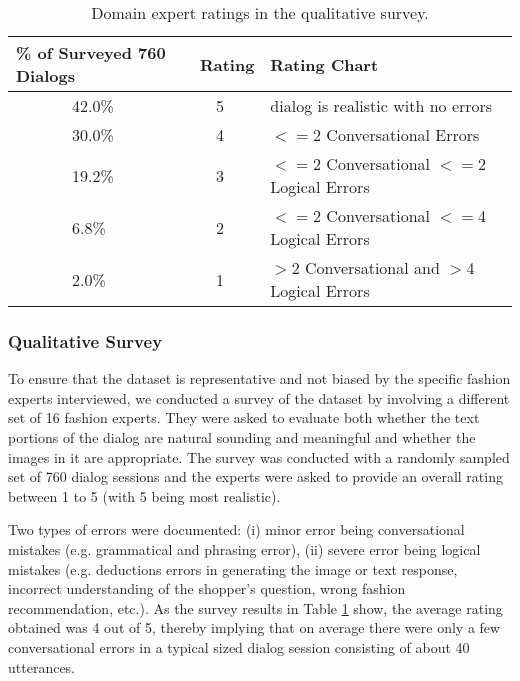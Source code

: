 \documentclass[letterpaper]{article} %
\begin{document}
\begin{table}[!htbp]
{\tiny
\captionsetup{font=small}
\begin{center}
\begin{tabular}{|p{1.84cm}|p{0.7cm}|p{4cm}|}\hline
\textbf{\% of Surveyed 760 Dialogs} & \textbf{Rating} & \textbf{Rating Chart} \\ \hline
~~~~~~~42.0\% & ~~5 & dialog is realistic with no errors \\ \hline
~~~~~~~30.0\% & ~~4 & $<=$2 Conversational Errors\\ \hline
~~~~~~~19.2\% & ~~3 & $<=$2 Conversational $<=$2 Logical Errors  \\ \hline
~~~~~~~6.8\% & ~~2 & $<=$2 Conversational $<=$4 Logical Errors \\ \hline
~~~~~~~2.0\% & ~~1 & $>$2 Conversational and $>$4 Logical Errors \\ \hline
\end{tabular}
\end{center}
}
\caption{Domain expert ratings in the qualitative survey.}
\label{tab:survey}
\end{table}

\subsubsection{Qualitative Survey}

To ensure that the dataset is representative and not biased by the specific fashion experts interviewed, we conducted a survey of the dataset by involving a different set of 16 fashion experts. They were asked to evaluate both whether the text portions of the dialog are natural sounding and meaningful and whether the images in it are appropriate. The survey was conducted with a randomly sampled set of 760 dialog sessions and the experts were asked to provide an overall rating between 1 to 5 (with 5 being most realistic). 

Two types of errors were documented: (i) minor error being conversational mistakes (e.g. grammatical and phrasing error), (ii) severe error being logical mistakes (e.g. deductions errors in generating the image or text response, incorrect understanding of the shopper's question, wrong fashion recommendation, etc.). As the survey results in Table \ref{tab:survey} show, the average rating obtained was 4 out of 5, thereby implying that on average there were only a few conversational errors in a typical sized dialog session consisting of about 40 utterances.
\end{document}
